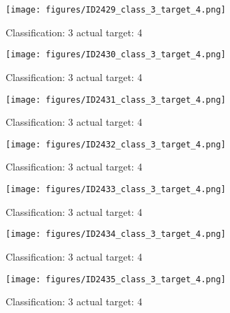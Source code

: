 \begin{figure}[h!]
\begin{center}
\texttt{[image: figures/ID2429\_class\_3\_target\_4.png]}
\end{center}
\caption{ Classification: 3 actual target: 4}
\label{fig:ID2429_class_3_target_4}
\end{figure}
\begin{figure}[h!]
\begin{center}
\texttt{[image: figures/ID2430\_class\_3\_target\_4.png]}
\end{center}
\caption{ Classification: 3 actual target: 4}
\label{fig:ID2430_class_3_target_4}
\end{figure}
\begin{figure}[h!]
\begin{center}
\texttt{[image: figures/ID2431\_class\_3\_target\_4.png]}
\end{center}
\caption{ Classification: 3 actual target: 4}
\label{fig:ID2431_class_3_target_4}
\end{figure}
\begin{figure}[h!]
\begin{center}
\texttt{[image: figures/ID2432\_class\_3\_target\_4.png]}
\end{center}
\caption{ Classification: 3 actual target: 4}
\label{fig:ID2432_class_3_target_4}
\end{figure}
\begin{figure}[h!]
\begin{center}
\texttt{[image: figures/ID2433\_class\_3\_target\_4.png]}
\end{center}
\caption{ Classification: 3 actual target: 4}
\label{fig:ID2433_class_3_target_4}
\end{figure}
\begin{figure}[h!]
\begin{center}
\texttt{[image: figures/ID2434\_class\_3\_target\_4.png]}
\end{center}
\caption{ Classification: 3 actual target: 4}
\label{fig:ID2434_class_3_target_4}
\end{figure}
\begin{figure}[h!]
\begin{center}
\texttt{[image: figures/ID2435\_class\_3\_target\_4.png]}
\end{center}
\caption{ Classification: 3 actual target: 4}
\label{fig:ID2435_class_3_target_4}
\end{figure}
